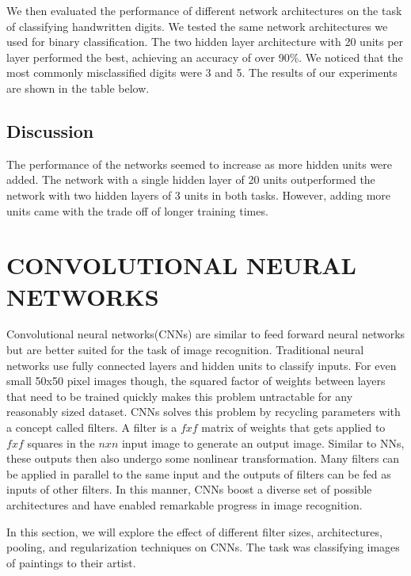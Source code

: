 \documentclass[10pt,twoside]{article}
\begin{document}
We then evaluated the performance of different network architectures on the task of classifying handwritten digits. We tested the same network architectures we used for binary classification. The two hidden layer architecture with 20 units per layer performed the best, achieving an accuracy of over 90\%. We noticed that the most commonly misclassified digits were 3 and 5. The results of our experiments are shown in the table below. 

\subsection{Discussion}

The performance of the networks seemed to increase as more hidden units were added. The network with a single hidden layer of 20 units outperformed the network with two hidden layers of 3 units in both tasks. However, adding more units came with the trade off of longer training times. 


\section{\uppercase{Convolutional Neural Networks}}

\noindent Convolutional neural networks(CNNs) are similar to feed forward neural networks but are better suited for the task of image recognition. Traditional neural networks use fully connected layers and hidden units to classify inputs. For even small 50x50 pixel images though, the squared factor of weights between layers that need to be trained quickly makes this problem untractable for any reasonably sized dataset.  CNNs solves this problem by recycling parameters with a concept called filters. A filter is a $fxf$ matrix of weights that gets applied to $fxf$ squares in the $nxn$ input image to generate an output image. Similar to NNs, these outputs then also undergo some nonlinear transformation. Many filters can be applied in parallel to the same input and the outputs of filters can be fed as inputs of other filters. In this manner, CNNs boost a diverse set of possible architectures and have enabled remarkable progress in image recognition.

In this section, we will explore the effect of different filter sizes, architectures, pooling, and regularization techniques on CNNs. The task was classifying images of paintings to their artist.
\end{document}
